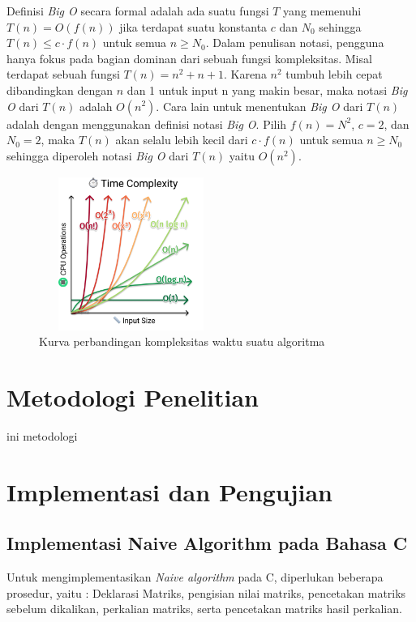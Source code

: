 \documentclass[conference]{IEEEtran}
\begin{document}
Definisi \textit{Big O} secara formal adalah ada suatu fungsi $T$ yang memenuhi
$T(n) = O(f(n))$ jika terdapat suatu konstanta $c$ dan $N_0$ sehingga $T(n) \le c \cdot f(n)$ untuk semua $n \ge N_0$.
Dalam penulisan notasi, pengguna hanya fokus pada bagian dominan dari sebuah fungsi kompleksitas.
Misal terdapat sebuah fungsi $T(n) = n^2 + n + 1$.
Karena $n^2$ tumbuh lebih cepat dibandingkan dengan $n$ dan 1 untuk input n yang makin besar, 
maka notasi \textit{Big O} dari $T(n)$ adalah $O(n^2)$.
Cara lain untuk menentukan \textit{Big O} dari $T(n)$ adalah dengan menggunakan definisi notasi \textit{Big O}.
Pilih $f(n) = N^2$, $c = 2$, dan $N_0 = 2$, maka $T(n)$ akan selalu lebih kecil dari $c \cdot f(n)$ untuk semua $n \ge N_0$ 
sehingga diperoleh notasi \textit{Big O} dari $T(n)$ yaitu $O(n^2)$.

\begin{figure}[h]
   \includegraphics[width = 6cm, height = 5cm]{Kurva_Kompleksitas_Waktu.png}
   \centering
   \caption{Kurva perbandingan kompleksitas waktu suatu algoritma}
\end{figure}

\section{Metodologi Penelitian}
ini metodologi

\section{Implementasi dan Pengujian}

\subsection{Implementasi Naive Algorithm pada Bahasa C}
Untuk mengimplementasikan \textit{Naive algorithm} pada C, diperlukan beberapa prosedur, yaitu : Deklarasi Matriks, pengisian nilai matriks, pencetakan matriks sebelum dikalikan, perkalian matriks, serta pencetakan matriks hasil perkalian. 
\end{document}
